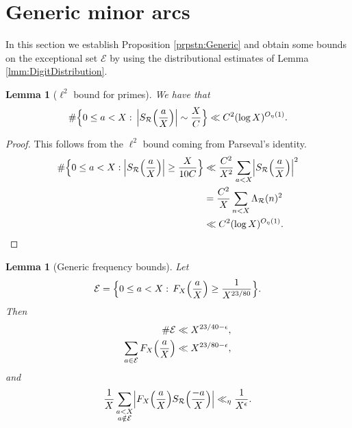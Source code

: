 \documentclass[10pt]{amsart}
\theoremstyle{plain}
\newtheorem{lmm}[thrm]{Lemma}
\numberwithin{sblmm}{thrm}
\numberwithin{equation}{section}
\begin{document}
\section{Generic minor arcs}\label{sec:Generic}
%
%
%
In this section we establish Proposition \ref{prpstn:Generic} and obtain some bounds on the exceptional set $\mathcal{E}$ by using the distributional estimates of Lemma \ref{lmm:DigitDistribution}.
%
%
%
%
\begin{lmm}[$\ell^2$ bound for primes]\label{lmm:PrimeDistribution}
%
We have that
\[
\#\Bigl\{0\le a<X:\,\Bigl|S_{\mathcal{R}}\Bigl(\frac{a}{X}\Bigr)\Bigr|\sim\frac{X}{C}\Bigr\}\ll C^2(\log{X})^{O_\eta(1)}.
\]
\end{lmm}
%
%
%
%
\begin{proof}
%
This follows from the $\ell^2$ bound coming from Parseval's identity.
%
\begin{align*}
\#\Bigl\{0\le a<X:\Bigl|S_{\mathcal{R}}\Bigl(\frac{a}{X}\Bigr)\Bigr|\ge\frac{X}{10C}\Bigr\}
&\ll \frac{C^{2}}{X^2}\sum_{a<X}\Bigl|S_{\mathcal{R}}\Bigl(\frac{a}{X}\Bigr)\Bigr|^2\\
&=\frac{C^2}{X}\sum_{n<X}\Lambda_{\mathcal{R}}(n)^2\\
&\ll C^2(\log{X})^{O_\eta(1)}.\qedhere
\end{align*}
%
\end{proof}
%
%
%
%
\begin{lmm}[Generic frequency bounds] \label{lmm:Generic}
%
Let
\[
\mathcal{E}=\Bigl\{0\le a<X:\, F_X\Bigl(\frac{a}{X}\Bigr)\ge \frac{1}{X^{23/80}}\Bigr\}.
\]
Then
%
\begin{align*}
\#\mathcal{E}&\ll X^{23/40-\epsilon},\\
\sum_{a\in\mathcal{E}}F_X\Bigl(\frac{a}{X}\Bigr)&\ll X^{23/80-\epsilon},
\end{align*}
%
and
\[
\frac{1}{X}\sum_{\substack{a<X\\ a\notin\mathcal{E}}}\Bigl|F_X\Bigl(\frac{a}{X}\Bigr)S_{\mathcal{R}}\Bigl(\frac{-a}{X}\Bigr)\Bigr|\ll_\eta\frac{1}{X^{\epsilon}}.
\]
%
\end{lmm}
%
%
%
%
\end{document}

